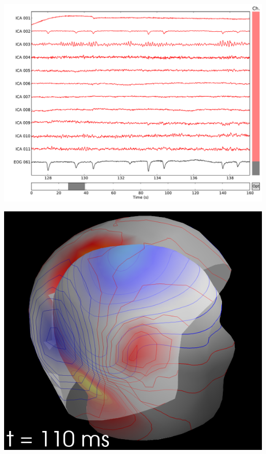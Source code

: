 \documentclass[t,11pt,compress]{beamer} %
\newcommand{\vfillll}{\vfilll\vfilll\vfilll\vfilll\vfilll\vfilll\vfilll\vfilll\vfilll\vfilll\vfilll\vfilll\vfilll\vfilll\vfilll\vfilll\vfilll\vfilll\vfilll\vfilll\vfilll\vfilll\vfilll\vfilll\vfilll\vfilll\vfilll\vfilll\vfilll\vfilll\vfilll\vfilll\vfilll\vfilll\vfilll\vfilll\vfilll\vfilll\vfilll\vfilll}
\begin{document}
\begin{frame}[plain,t,c]
\vfillll


\vfillll

\vspace*{-0.5em}%


\begin{minipage}{1.09\linewidth}

\hspace{-0.1em}%
\begin{minipage}{.21\linewidth}
    \includegraphics[width=\linewidth]{ica_via_browser.pdf}%
\end{minipage}%
\hspace{.4em}%
\begin{minipage}{.16\linewidth}
    \includegraphics[width=\linewidth]{plot_meg_eeg_fields_3d_1.png}

\end{minipage}
\end{minipage}
\end{frame}
\end{document}
